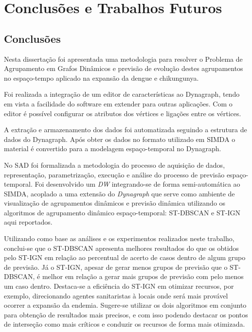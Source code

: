 \chapter{Conclusões e Trabalhos Futuros}
\label{chap:conclusoes-e-trabalhos-futuros}

\section{Conclusões}
\label{sec:conclusoes}

Nesta dissertação foi apresentada uma metodologia para resolver o Problema de Agrupamento em Grafos Dinâmicos e previsão de evolução destes agrupamentos no espaço-tempo aplicado na expansão da dengue e chikungunya.

Foi realizada a integração de um editor de características ao Dynagraph, tendo em vista a facilidade do software em extender para outras aplicações. Com o editor é possível configurar os atributos dos vértices e ligações entre os vértices.

A extração e armazenamento dos dados foi automatizada seguindo a estrutura de dados do Dynagraph. Após obter os dados no formato utilizado em \acrshort{SIMDA} o material é convertido para a modelagem espaço-temporal no Dynagraph.

No \acrfull{SAD} foi formalizada a metodologia do processo de aquisição de dados, representação, parametrização, execução e análise do processo de previsão espaço-temporal. Foi desenvolvido um \textit{\acrfull{DW}} integrando-se de forma semi-automática ao \acrshort{SIMDA}, acoplado a uma extensão do \emph{Dynagraph} que serve como ambiente de visualização de agrupamentos dinâmicos e previsão dinâmica utilizando os algoritmos de agrupamento dinâmico espaço-temporal: \acrshort{ST-DBSCAN} e \acrshort{ST-IGN} aqui reportados. 

Utilizando como base as análises e os experimentos realizados neste trabalho, conclui-se que o \acrshort{ST-DBSCAN} apresenta melhores resultados do que os obtidos pelo \acrshort{ST-IGN} em relação ao percentual de acerto de casos dentro de algum grupo de previsão. Já o \acrshort{ST-IGN}, apesar de gerar menos grupos de previsão que o \acrshort{ST-DBSCAN}, é melhor em relação a gerar mais grupos de previsão com pelo menos um caso dentro. Destaca-se a eficiência do \acrshort{ST-IGN} em otimizar recursos, por exemplo, direcionando agentes sanitaristas à locais onde será mais provável ocorrer a expansão da endemia.
Sugere-se utilizar os dois algoritmos em conjunto para obtenção de resultados mais precisos, e com isso podendo destacar os pontos de interseção como mais críticos e conduzir os recursos de forma mais otimizada.

